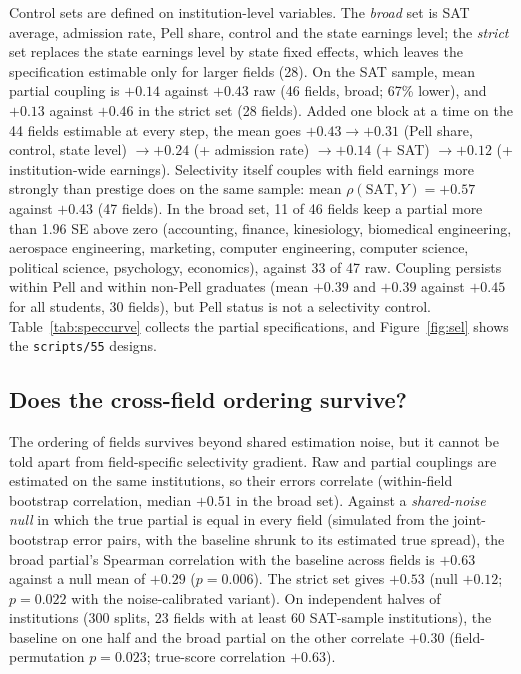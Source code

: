 \documentclass[11pt]{article}
\newcommand{\scr}[1]{\texttt{scripts/#1}}
\begin{document}
Control sets are defined on institution-level variables. The \emph{broad} set is SAT average, admission rate,
Pell share, control and the state earnings level; the \emph{strict} set replaces the state earnings level by
state fixed effects, which leaves the specification estimable only for larger fields (28). On the SAT sample,
mean partial coupling is $+0.14$ against $+0.43$ raw (46 fields, broad; 67\% lower), and $+0.13$ against $+0.46$
in the strict set (28 fields). Added one block at a time on the 44 fields estimable at every step, the mean goes
$+0.43\to+0.31$ (Pell share, control, state level) $\to+0.24$ (+ admission rate) $\to+0.14$ (+ SAT) $\to+0.12$
(+ institution-wide earnings). Selectivity itself couples with field earnings more strongly than prestige does
on the same sample: mean $\rho(\text{SAT},Y)=+0.57$ against $+0.43$ (47 fields). In the broad set, 11 of 46 fields
keep a partial more than 1.96 SE above zero (accounting, finance, kinesiology, biomedical engineering, aerospace
engineering, marketing, computer engineering, computer science, political science, psychology, economics),
against 33 of 47 raw. Coupling persists within Pell and within non-Pell graduates (mean $+0.39$ and $+0.39$
against $+0.45$ for all students, 30 fields), but Pell status is not a selectivity control. Table~\ref{tab:speccurve}
collects the partial specifications, and Figure~\ref{fig:sel} shows the \scr{55} designs.

\subsection{Does the cross-field ordering survive?}\label{sec:ordering}

The ordering of fields survives beyond shared estimation noise, but it cannot be told apart from
field-specific selectivity gradient. Raw and partial couplings are estimated on the same institutions, so their
errors correlate (within-field bootstrap correlation, median $+0.51$ in the broad set). Against a
\emph{shared-noise null} in which the true partial is equal in every field (simulated from the joint-bootstrap
error pairs, with the baseline shrunk to its estimated true spread), the broad partial's Spearman correlation
with the baseline across fields is $+0.63$ against a null mean of $+0.29$ ($p=0.006$). The strict set gives
$+0.53$ (null $+0.12$; $p=0.022$ with the noise-calibrated variant). On independent halves of institutions (300
splits, 23 fields with at least 60 SAT-sample institutions), the baseline on one half and the broad partial on
the other correlate $+0.30$ (field-permutation $p=0.023$; true-score correlation $+0.63$).
\end{document}
